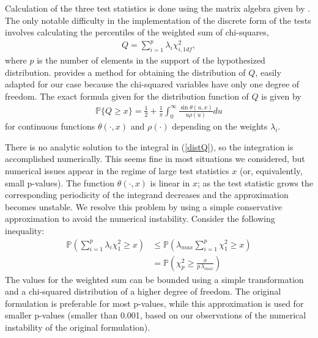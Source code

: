 Calculation of the three test statistics is done using the
matrix algebra given by \cite{choulakian1994}. 
The only notable difficulty in the implementation of the discrete form
of the tests involves calculating the percentiles
of the weighted sum of chi-squares,
\begin{align}
Q = \sum_{i=1}^{p} \lambda_i \chi^2_{i,1df},   \label{eqQ}
\end{align}
where $p$ is the number of elements in the support of the hypothesized
distribution.
\cite{imhof1961} provides a method for obtaining the distribution of $Q$,
easily adapted for our case because
the chi-squared variables have only one degree of freedom.
The exact formula given for the distribution function of $Q$
is given by
\begin{align}
\mathbb{P}\{Q \geq x \} = \frac{1}{2} + 
\frac{1}{\pi} \int_{0}^{\infty} \frac{\sin\theta(u,x)}{u \rho(u) } du
\label{distQ}
\end{align}
for continuous functions $\theta(\cdot, x)$ and $\rho(\cdot)$ depending on the  weights $\lambda_i$. 

There is no analytic solution to the integral in (\ref{distQ}), 
so the integration is
accomplished numerically. This seems fine in most situations we considered,
but numerical issues appear in the regime of large test statistics $x$
(or, equivalently, small p-values).
The function $\theta(\cdot, x)$ is linear in $x$; as the test statistic 
grows the corresponding periodicity of the integrand decreases and
the approximation becomes unstable. 
We resolve this problem by using a simple conservative approximation to
avoid the numerical instability. Consider the
following inequality:
\begin{align}
\mathbb{P} \left(\sum_{i=1}^{p} \lambda_i \chi^2_1 \geq x \right) &\leq \mathbb{P} \left( \lambda_{max} \sum_{i=1}^{p} \chi^2_1 \geq x \right) \label{ineq1} \\
&= \mathbb{P} \left(\chi^2_p \geq \frac{x}{p \, \lambda_{max}} \right)
\label{ineq2}
\end{align}
The values for the weighted sum can be bounded using a simple transformation
and a chi-squared distribution of a higher degree of freedom. 
The original formulation is preferable for most p-values, while
this approximation is used for smaller p-values (smaller than 0.001,
based on our observations of the numerical instability of the original
formulation).

